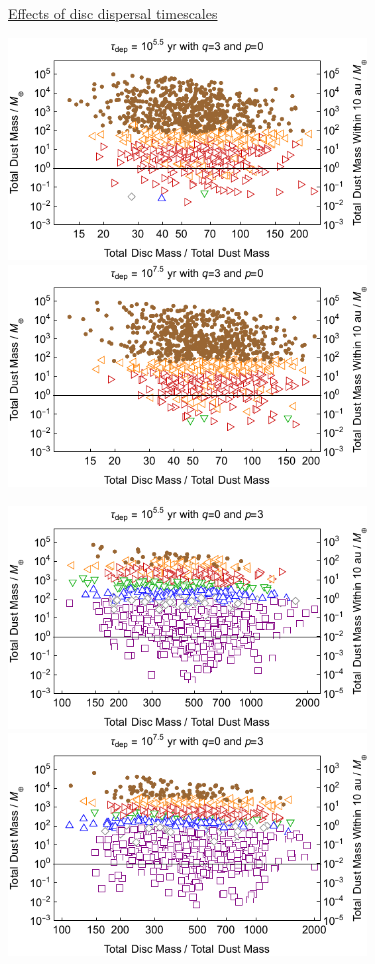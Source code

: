 \documentclass[useAMS,usenatbib]{mn2e}
\begin{document}
\begin{figure}
\centerline{\Huge \underline{Effects of disc dispersal timescales}}
\centerline{}
\centerline{}
\centerline{
\includegraphics[width=9.5cm]{PlotM10q30p00tdep55}
\includegraphics[width=9.5cm]{PlotM10q30p00tdep75}
}
\centerline{}
\centerline{
\includegraphics[width=9.5cm]{PlotM10q00p30tdep55}
\includegraphics[width=9.5cm]{PlotM10q00p30tdep75}
}
\end{figure}
\end{document}
